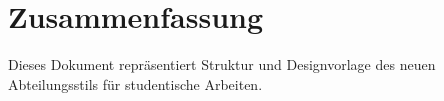 \chapter*{Zusammenfassung}
Dieses Dokument repräsentiert Struktur und Designvorlage des neuen
Abteilungsstils für studentische Arbeiten.

